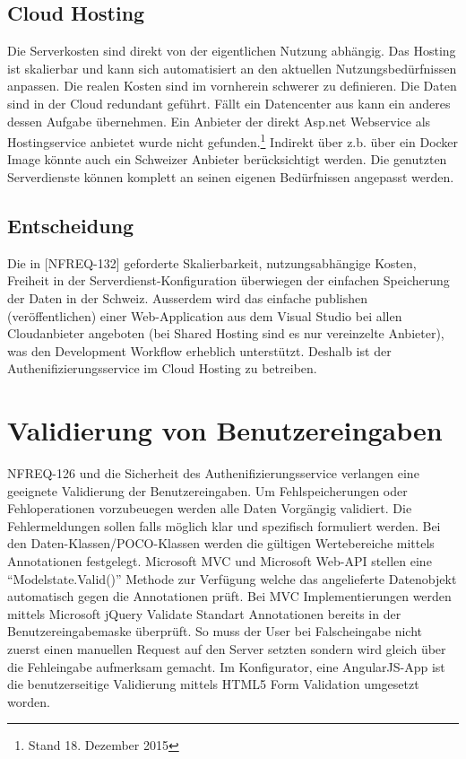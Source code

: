 \subsection{Cloud Hosting}\label{cloud-hosting}

Die Serverkosten sind direkt von der eigentlichen Nutzung abhängig. Das
Hosting ist skalierbar und kann sich automatisiert an den aktuellen
Nutzungsbedürfnissen anpassen. Die realen Kosten sind im vornherein
schwerer zu definieren. Die Daten sind in der Cloud redundant geführt.
Fällt ein Datencenter aus kann ein anderes dessen Aufgabe übernehmen.
Ein Anbieter der direkt Asp.net Webservice als Hostingservice anbietet
wurde nicht gefunden.\footnote{Stand 18. Dezember 2015} Indirekt über
z.b. über ein Docker Image könnte auch ein Schweizer Anbieter
berücksichtigt werden. Die genutzten Serverdienste können komplett an
seinen eigenen Bedürfnissen angepasst werden.

\subsection{Entscheidung}\label{entscheidung-2}

Die in {[}NFREQ-132{]} geforderte Skalierbarkeit, nutzungsabhängige
Kosten, Freiheit in der Serverdienst-Konfiguration überwiegen der
einfachen Speicherung der Daten in der Schweiz. Ausserdem wird das
einfache publishen (veröffentlichen) einer Web-Application aus dem
Visual Studio bei allen Cloudanbieter angeboten (bei Shared Hosting sind
es nur vereinzelte Anbieter), was den Development Workflow erheblich
unterstützt. Deshalb ist der Authenifizierungsservice im Cloud Hosting
zu betreiben.

\section{Validierung von
Benutzereingaben}\label{validierung-von-benutzereingaben}

NFREQ-126 und die Sicherheit des Authenifizierungsservice verlangen eine
geeignete Validierung der Benutzereingaben. Um Fehlspeicherungen oder
Fehloperationen vorzubeuegen werden alle Daten Vorgängig validiert. Die
Fehlermeldungen sollen falls möglich klar und spezifisch formuliert
werden. Bei den Daten-Klassen/POCO-Klassen werden die gültigen
Wertebereiche mittels Annotationen festgelegt. Microsoft MVC und
Microsoft Web-API stellen eine ``Modelstate.Valid()'' Methode zur
Verfügung welche das angelieferte Datenobjekt automatisch gegen die
Annotationen prüft. Bei MVC Implementierungen werden mittels Microsoft
jQuery Validate Standart Annotationen bereits in der
Benutzereingabemaske überprüft. So muss der User bei Falscheingabe nicht
zuerst einen manuellen Request auf den Server setzten sondern wird
gleich über die Fehleingabe aufmerksam gemacht. Im Konfigurator, eine
AngularJS-App ist die benutzerseitige Validierung mittels HTML5 Form
Validation umgesetzt worden.

